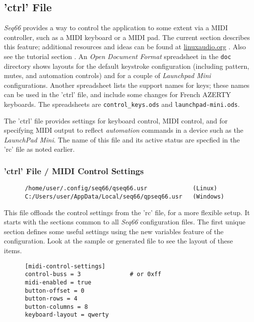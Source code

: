 \subsection{'ctrl' File}
\label{subsec:configuration_ctrl}

   \textsl{Seq66} provides a way to control the
   application to some extent via a MIDI controller, such as a MIDI keyboard or
   a MIDI pad.  The current section describes this feature;
   additional resources and ideas can be found at \url{linuxaudio.org}
   \cite{midicontrol}.
   Also see the tutorial section .
   An \textsl{Open Document Format} spreadsheet in the
   \texttt{doc} directory shows layouts for the default
   keystroke configuration (including pattern, mutes, and automation controls)
   and for a couple of \textsl{Launchpad Mini} configurations.
   Another spreadsheet lists the support names for keys; these names can be used
   in the 'ctrl' file, and include some changes for French AZERTY keyboards.
   The spreadsheets are
   \texttt{control\_keys.ods} and
   \texttt{launchpad-mini.ods}.

   The 'ctrl' file provides settings for keyboard control, MIDI control, and
   for specifying MIDI output to reflect \textsl{automation} commands in a
   device such as the \textsl{LaunchPad Mini}.  The name of this file and its
   active status are specfied in the 'rc' file as noted earlier.

\subsubsection{'ctrl' File / MIDI Control Settings}
\label{subsubsec:configuration_ctrl_midi_control_settings}

   \begin{verbatim}
      /home/user/.config/seq66/qseq66.usr             (Linux)
      C:/Users/user/AppData/Local/seq66/qpseq66.usr   (Windows)
   \end{verbatim}

   This file offloads the control settings from the 'rc' file, for a more
   flexible setup. It starts with the sections common to all \textsl{Seq66}
   configuration files.  The first unique section defines some useful settings
   using the new variables feature of the configuration.  Look at the sample or
   generated file to see the layout of these items.

   \begin{verbatim}
      [midi-control-settings]
      control-buss = 3              # or 0xff
      midi-enabled = true
      button-offset = 0
      button-rows = 4
      button-columns = 8
      keyboard-layout = qwerty
   \end{verbatim}

